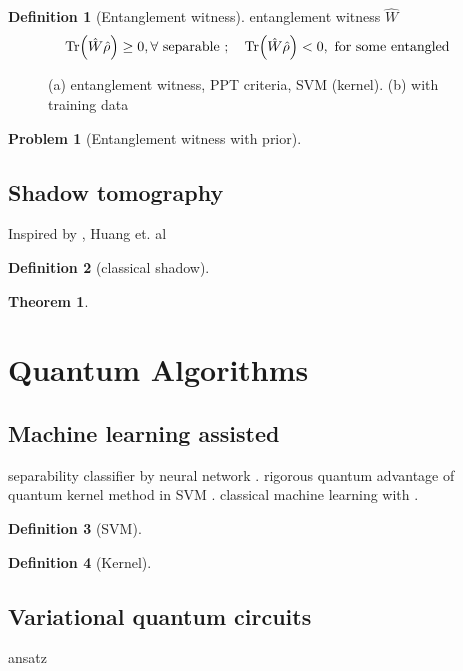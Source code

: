 \documentclass[
aps,
pra,
linenumbers,
floatfix,
]{revtex4-2}
\theoremstyle{plain}
\newtheorem{theorem}{Theorem}
\theoremstyle{definition}
\newtheorem{definition}{Definition}
\newtheorem{problem}{Problem}
\newcommand{\ew}{\hat{W}}
\newcommand{\dm}{\hat{\rho}}
\begin{document}
\begin{definition}[Entanglement witness]
	entanglement witness $\ew$
	\begin{equation}
		\Tr(\ew\dm) \ge 0 , \forall \text{ separable };\quad
		\Tr(\ew\dm) < 0 , \text{ for some entangled }
	\end{equation}
\end{definition}
\begin{figure}[!ht]
	\centering
	\caption{(a) entanglement witness, PPT criteria, SVM (kernel). (b) with training data}
\end{figure}
\begin{problem}[Entanglement witness with prior]
	\cite{zhouDetectingMultipartiteEntanglement2019}
\end{problem}

\subsection{Shadow tomography}
Inspired by \cite{aaronsonShadowTomographyQuantum2018}, Huang et. al \cite{huangPredictingManyProperties2020}
\begin{definition}[classical shadow]\label{def:classical_shadow}
\end{definition}
\begin{theorem}
\end{theorem}

\section{Quantum Algorithms}

\subsection{Machine learning assisted}
separability classifier by neural network \cite{luSeparabilityEntanglementClassifierMachine2018}.
rigorous quantum advantage of quantum kernel method in SVM \cite{liuRigorousRobustQuantum2021}.
classical machine learning with  \cite{huangProvablyEfficientMachine2021}.
\begin{definition}[SVM]
\end{definition}
\begin{definition}[Kernel]
\end{definition}

\subsection{Variational quantum circuits}
ansatz
\end{document}
